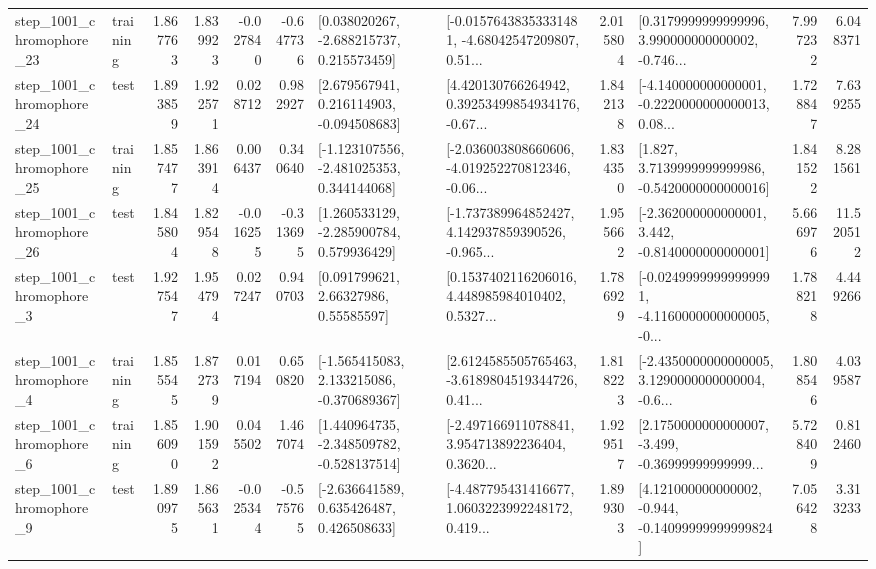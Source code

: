 \begin{tabular}{llrrrrllrlrr}
 step\_1001\_chromophore\_23 &  training &      1.867763 &    1.839923 &     -0.027840 & -0.647736 &    [0.038020267, -2.688215737, 0.215573459] &  [-0.01576438353331481, -4.68042547209807, 0.51... &       2.015804 &  [0.3179999999999996, 3.990000000000002, -0.746... &            7.997232 &          6.048371 \\
 step\_1001\_chromophore\_24 &      test &      1.893859 &    1.922571 &      0.028712 &  0.982927 &    [2.679567941, 0.216114903, -0.094508683] &  [4.420130766264942, 0.39253499854934176, -0.67... &       1.842138 &  [-4.140000000000001, -0.2220000000000013, 0.08... &            1.728847 &          7.639255 \\
 step\_1001\_chromophore\_25 &  training &      1.857477 &    1.863914 &      0.006437 &  0.340640 &   [-1.123107556, -2.481025353, 0.344144068] &  [-2.036003808660606, -4.019252270812346, -0.06... &       1.834350 &   [1.827, 3.7139999999999986, -0.5420000000000016] &            1.841522 &          8.281561 \\
 step\_1001\_chromophore\_26 &      test &      1.845804 &    1.829548 &     -0.016255 & -0.313695 &    [1.260533129, -2.285900784, 0.579936429] &  [-1.737389964852427, 4.142937859390526, -0.965... &       1.955662 &   [-2.362000000000001, 3.442, -0.8140000000000001] &            5.666976 &         11.520512 \\
  step\_1001\_chromophore\_3 &      test &      1.927547 &    1.954794 &      0.027247 &  0.940703 &       [0.091799621, 2.66327986, 0.55585597] &  [0.1537402116206016, 4.448985984010402, 0.5327... &       1.786929 &  [-0.02499999999999991, -4.1160000000000005, -0... &            1.788218 &          4.449266 \\
  step\_1001\_chromophore\_4 &  training &      1.855545 &    1.872739 &      0.017194 &  0.650820 &   [-1.565415083, 2.133215086, -0.370689367] &  [2.6124585505765463, -3.6189804519344726, 0.41... &       1.818223 &  [-2.4350000000000005, 3.1290000000000004, -0.6... &            1.808546 &          4.039587 \\
  step\_1001\_chromophore\_6 &  training &      1.856090 &    1.901592 &      0.045502 &  1.467074 &   [1.440964735, -2.348509782, -0.528137514] &  [-2.497166911078841, 3.954713892236404, 0.3620... &       1.929517 &  [2.1750000000000007, -3.499, -0.36999999999999... &            5.728409 &          0.812460 \\
  step\_1001\_chromophore\_9 &      test &      1.890975 &    1.865631 &     -0.025344 & -0.575765 &    [-2.636641589, 0.635426487, 0.426508633] &  [-4.487795431416677, 1.0603223992248172, 0.419... &       1.899303 &  [4.121000000000002, -0.944, -0.14099999999999824] &            7.056428 &          3.313233 \\

\end{tabular}

